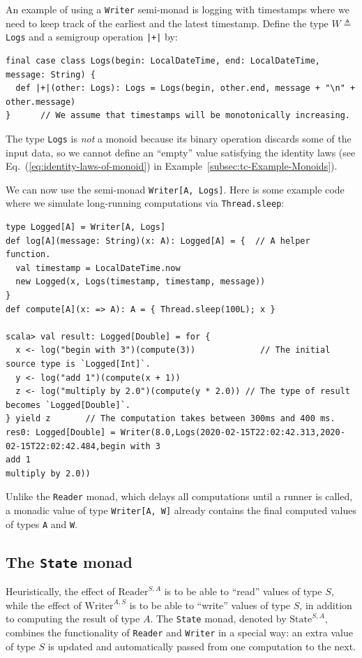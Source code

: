 An example of using a \lstinline!Writer! semi-monad
is logging with timestamps where we need to keep track of the earliest
and the latest timestamp. Define the type $W\triangleq~$\lstinline!Logs!
and a semigroup operation \lstinline!|+|! by:
\begin{lstlisting}
final case class Logs(begin: LocalDateTime, end: LocalDateTime, message: String) {
  def |+|(other: Logs): Logs = Logs(begin, other.end, message + "\n" + other.message)
}      // We assume that timestamps will be monotonically increasing.
\end{lstlisting}
The type \lstinline!Logs! is \emph{not} a monoid because its binary
operation discards some of the input data, so we cannot define an
\textsf{``}empty\textsf{''} value satisfying the identity laws (see Eq.~(\ref{eq:identity-laws-of-monoid})
in Example~\ref{subsec:tc-Example-Monoids}).

We can now use the semi-monad \lstinline!Writer[A, Logs]!. Here is
some example code where we simulate long-running computations via
\lstinline!Thread.sleep!:
\begin{lstlisting}
type Logged[A] = Writer[A, Logs]
def log[A](message: String)(x: A): Logged[A] = {  // A helper function.
  val timestamp = LocalDateTime.now
  new Logged(x, Logs(timestamp, timestamp, message))
}
def compute[A](x: => A): A = { Thread.sleep(100L); x }

scala> val result: Logged[Double] = for {
  x <- log("begin with 3")(compute(3))             // The initial source type is `Logged[Int]`.
  y <- log("add 1")(compute(x + 1))
  z <- log("multiply by 2.0")(compute(y * 2.0)) // The type of result becomes `Logged[Double]`.
} yield z       // The computation takes between 300ms and 400 ms.
res0: Logged[Double] = Writer(8.0,Logs(2020-02-15T22:02:42.313,2020-02-15T22:02:42.484,begin with 3
add 1
multiply by 2.0))
\end{lstlisting}

Unlike the \lstinline!Reader! monad, which delays all computations
until a runner is called, a monadic value of type \lstinline!Writer[A, W]!
already contains the final computed values of types \lstinline!A!
and \lstinline!W!.

\subsection{The \texttt{State} monad\label{subsec:The-State-monad}}

Heuristically, the effect of $\text{Reader}^{S,A}$ is to be able
to \textsf{``}read\textsf{''} values of type $S$, while the effect of $\text{Writer}^{A,S}$
is to be able to \textsf{``}write\textsf{''} values of type $S$, in addition to computing
the result of type $A$. The \lstinline!State! monad, denoted by
$\text{State}^{S,A}$, combines the functionality of \lstinline!Reader!
and \lstinline!Writer! in a special way: an extra value of type $S$
is updated and automatically passed from one computation to the next. 

